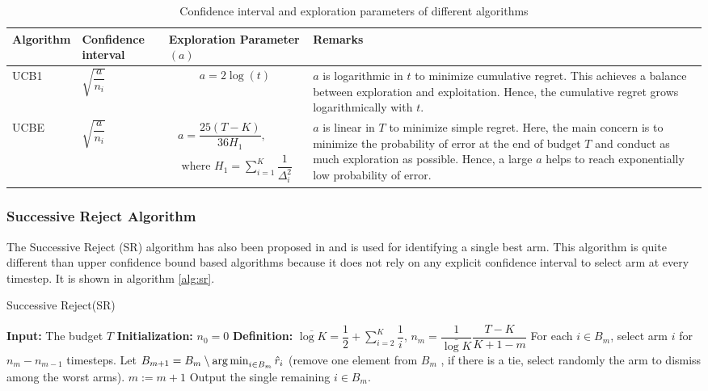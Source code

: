 \begin{table}
\caption{Confidence interval and exploration parameters of different algorithms}
\label{table:comp-exp}
\begin{center}
\begin{tabular}{|p{5em}|p{6em}|p{8em}|p{12em}|}
\hline
Algorithm  &  Confidence interval & Exploration Parameter$(a)$ & Remarks \\
\hline
\hline
UCB1       & $\sqrt{\dfrac{a}{n_i}}$ & \begin{align*}a = 2\log (t)\end{align*} & $a$ is logarithmic in $t$ to minimize cumulative regret. This achieves a balance between exploration and exploitation. Hence, the cumulative regret grows logarithmically with $t$. \\%
\hline
\hline
UCBE       & $\sqrt{\dfrac{a}{n_i}}$ & \begin{align*}a = \dfrac{25(T-K)}{36 H_1},\\ \text{ where }H_1 = \sum_{i=1}^{K}\dfrac{1}{\Delta_i^2}\end{align*} & $a$ is linear in $T$ to minimize simple regret. Here, the main concern is to minimize the probability of error at the end of budget $T$ and conduct as much exploration as possible. Hence, a large $a$ helps to reach exponentially low probability of error.\\\midrule
\end{tabular}
\end{center}
\end{table}


\subsubsection{Successive Reject Algorithm}

The Successive Reject (SR) algorithm has also been proposed in \citet{audibert2010best} and is used for identifying a single best arm. This algorithm is quite different than upper confidence bound based algorithms because it does not rely on any explicit confidence interval to select arm at every timestep. It is shown in algorithm \ref{alg:sr}.


\begin{algorithm}[!th]
\caption{Successive Reject(SR)}
\label{alg:sr}
\begin{algorithmic}[1]
\State \textbf{Input: } The budget $T$
\State \textbf{Initialization: } $n_0 = 0$
\State \textbf{Definition: } $\overline{\log K} = \dfrac{1}{2} + \sum_{i=2}^{K}\dfrac{1}{i}$, $n_m = \dfrac{1}{\bar{\log K}}\dfrac{T-K}{K + 1 - m}$
\State For each $i \in B_{m}$, select arm $i$ for $n_m - n_{m-1}$ timesteps.
\State Let $B_{m+1} = B_m\setminus \operatorname*{arg\,min}_{i\in B_m} \hat{r}_i$
(remove one element from $B_m$ , if there
is a tie, select randomly the arm to dismiss among the worst arms).
\State $m:=m+1 $
\EndFor
\State Output the single remaining $i\in B_{m}$.
\end{algorithmic}
\end{algorithm}


